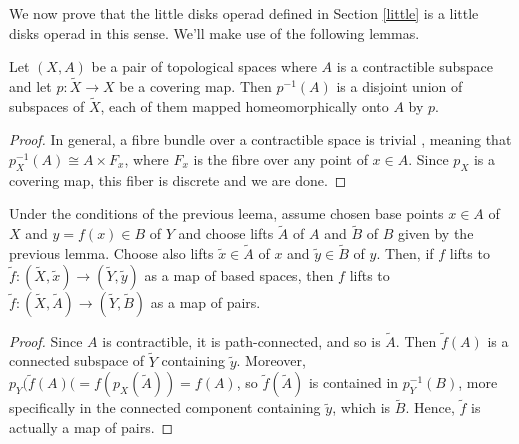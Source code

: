 \documentclass[TFM.tex]{subfiles}
\begin{document}


We now prove that the little disks operad defined in Section \ref{little} is a little disks operad in this sense. We'll make use of the following lemmas.

\begin{lemma}\label{contractible}
Let $(X,A)$ be a pair of topological spaces where $A$ is a contractible subspace  and let $p:\widetilde{X}\to X$ be a covering map. Then $p^{-1}(A)$ is a disjoint union of subspaces of $\widetilde{X}$, each of them mapped homeomorphically onto $A$ by $p$. 
\end{lemma}
\begin{proof}
In general, a fibre bundle over a contractible space is trivial \cite[Proposition 3.5]{bundle}, meaning that $p_X^{-1}(A)\cong A\times F_{x}$, where $F_x$ is the fibre over any point of $x\in A$. Since $p_X$ is a covering map, this fiber is discrete and we are done. 
\end{proof}

\begin{lemma}\label{lift}
Under the conditions of the previous leema, assume chosen base points $x\in A$ of $X$ and $y=f(x)\in B$ of $Y$ and choose lifts $\widetilde{A}$ of $A$ and $\widetilde{B}$ of $B$ given by the previous lemma. Choose also lifts $\widetilde{x}\in\widetilde{A}$ of $x$ and $\widetilde{y}\in\widetilde{B}$ of $y$. Then, if $f$ lifts to $\widetilde{f}:(\widetilde{X},\widetilde{x})\to (\widetilde{Y},\widetilde{y})$ as a map of based spaces, then $f$ lifts to $\widetilde{f}:(\widetilde{X},\widetilde{A})\to (\widetilde{Y},\widetilde{B})$ as a map of pairs. 
\end{lemma}
\begin{proof}
Since $A$ is contractible, it is path-connected, and so is $\widetilde{A}$. Then $\widetilde{f}(A)$ is a connected subspace of $\widetilde{Y}$ containing $\widetilde{y}$. Moreover, $p_Y(\widetilde{f}(A)(=f(p_X(\widetilde{A}))=f(A)$, so $\widetilde{f}(\widetilde{A})$ is contained in $p_Y^{-1}(B)$, more specifically in the connected component containing $\widetilde{y}$, which is $\widetilde{B}$. Hence, $\widetilde{f}$ is actually a map of pairs.
\end{proof}
\end{document}
